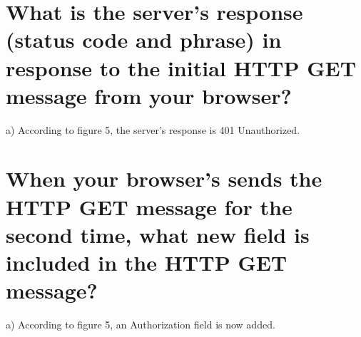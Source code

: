 \documentclass{article}
\begin{document}
\section{What is the server’s response (status code and phrase) in response to the initial
HTTP GET message from your browser?}
a)  According to figure 5, the server's response is 401 Unauthorized.\\
\section{When your browser’s sends the HTTP GET message for the second time, what
new field is included in the HTTP GET message?}
a) According to figure 5, an Authorization field is now added.\\
\end{document}
